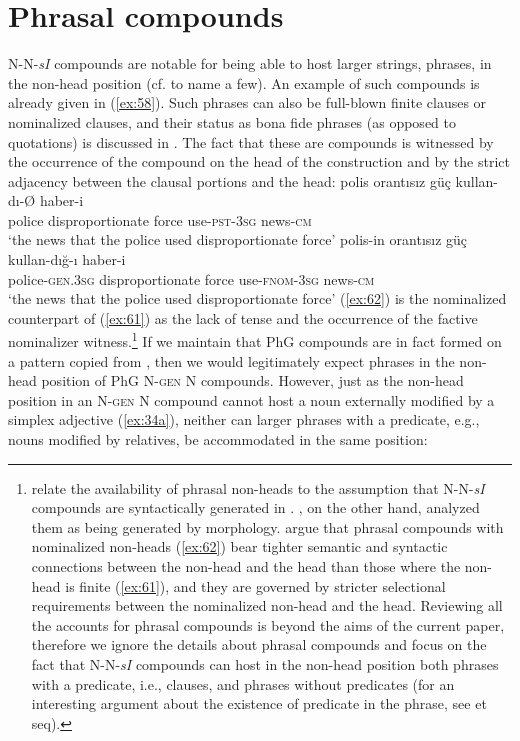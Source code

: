 \documentclass[output=paper]{LSP/langsci}
\begin{document}
\section{Phrasal compounds}
 N-N-\textit{sI} compounds are notable for being able to host larger strings, phra\-ses, in the non-head position (cf. \citealt{Schaaik2002,Gurer2010,Goksel2015, BagriacikRalli2015,TripsKornfilt2015typology} to name a few). An example of such compounds is already given in (\ref{ex:58}). Such phrases can also be full-blown finite clauses or nominalized clauses, and their status as bona fide phrases (as opposed to quotations) is discussed in \citet{Goksel2015}. The fact that these are compounds is witnessed by the occurrence of the compound  on the head of the construction and by the strict adjacency between the clausal portions and the head:
\ea\label{ex:61}
	\gll 	polis orantısız güç kullan-dı-{\O} haber-i\\
			police disproportionate force use-\textsc{pst-3sg} news-\textsc{cm}\\
	\glt `the news that the police used disproportionate force'
\z
\ea\label{ex:62}
	\gll polis-in orantısız güç kullan-dığ-ı haber-i\\
			police-\textsc{gen.3sg} disproportionate force use-\textsc{fnom-3sg} news-\textsc{cm}\\
	\glt `the news that the police used disproportionate force'
\z
(\ref{ex:62}) is the nominalized counterpart of (\ref{ex:61}) as the lack of tense  and the occurrence of the factive nominalizer witness.\footnote{\citet{BagriacikRalli2015} relate the availability of phrasal non-heads to the assumption that N-N-\textit{sI} compounds are syntactically generated in . \citet{Goksel2015}, on the other hand, analyzed them as being generated by morphology. \citet{TripsKornfilt2015typology} argue that phrasal compounds with nominalized non-heads (\ref{ex:62}) bear tighter semantic and syntactic connections between the non-head and the head than those where the non-head is finite (\ref{ex:61}), and they are governed by stricter selectional requirements between the nominalized non-head and the head. Reviewing all the accounts for  phrasal compounds is beyond the aims of the current paper, therefore we ignore the details about phrasal compounds and focus on the fact that  N-N-\textit{sI} compounds can host in the non-head position both phrases with a predicate, i.e., clauses, and phrases without predicates (for an interesting argument about the existence of predicate in the phrase, see \citealt{Trips2012} et seq). } If we maintain that PhG compounds are in fact formed on a pattern copied from , then we would legitimately expect phrases in the non-head position of PhG N-\textsc{gen} N compounds. However, just as the non-head position in an N-\textsc{gen} N compound cannot host a noun externally modified by a simplex adjective (\ref{ex:34a}), neither can larger phrases with a predicate, e.g., nouns modified by relatives, be accommodated in the same position: 
\end{document}
